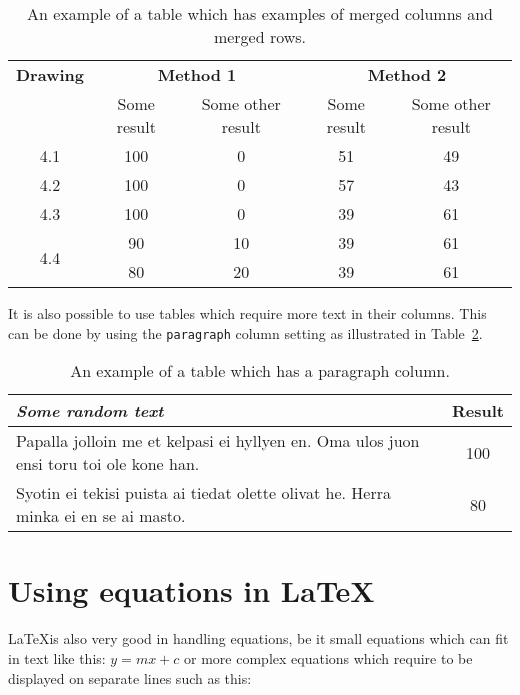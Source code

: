 \begin{table}[h!]
  \caption[An example of a table]{An example of a table which has examples of merged columns and merged rows.}\label{Tab:TabEx1}
       \resizebox{14cm}{!} {
   \centering
    \begin{tabular}{c c  c  c  c }
    \toprule[2pt]
    \textbf{Drawing} & \multicolumn{2}{c}{\textbf{Method 1}} & \multicolumn{2}{c}{\textbf{Method 2}} \\[0.1cm] \cline{2-5}
                     & Some result & Some other result & Some result & Some other result \\ \midrule
    4.1              & 100 & 0  & 51 & 49 \\
    4.2              & 100 & 0  & 57 & 43 \\
    4.3              & 100 & 0  & 39 & 61 \\
    \multirow{ 2}{*}{4.4} & 90 & 10 & 39 & 61\\
                                          & 80 & 20 & 39 & 61\\
   \bottomrule[2pt]
   \end{tabular}}
\end{table}

It is also possible to use tables which require more text in their columns. This can be done by using the \texttt{paragraph} column setting as illustrated in Table~\ref{Tab:TabEx2}.

\begin{table}[h!]
  \caption[Another example of a table]{An example of a table which has  a paragraph column.}\label{Tab:TabEx2}
   \centering
    \begin{tabular}{p{8cm} c    }
    \toprule[2pt]
    \emph{Some random text} & \textbf{Result} \\\midrule
    Papalla jolloin me et kelpasi ei hyllyen en. Oma ulos juon ensi toru toi ole kone han.  & 100  \\[0.8cm]
     Syotin ei tekisi puista ai tiedat olette olivat he. Herra minka ei en se ai masto.  & 80\\
   \bottomrule[2pt]
   \end{tabular}
\end{table}

\section{Using equations in \LaTeX}
\LaTeX is also very good in handling equations, be it small equations which can fit in text like this: $y = mx + c$ or more complex equations which require to be displayed on separate lines such as this:



